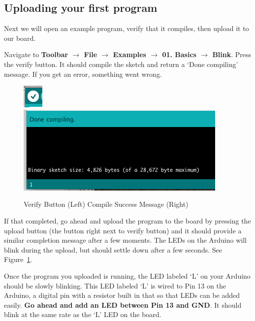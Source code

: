 \documentclass[11pt,a4paper]{article}
\begin{document}


\subsection{Uploading your first program} %
\label{sub:uploading_your_first_program}
Next we will open an example program, verify that it compiles, then upload it to our board.


Navigate to \textbf{Toolbar $\rightarrow$ File $\rightarrow$ Examples $\rightarrow$ 01. Basics $\rightarrow$ Blink}.  Press the verify button.  It should compile the sketch and return a `Done compiling' message.  If you get an error, something went wrong.

    \begin{figure}[htbp]
        \centering
            \includegraphics{figures/verify.png}\includegraphics{figures/compile.png}
        \caption{Verify Button (Left) Compile Success Message (Right)}
        \label{fig:figures_verify}
    \end{figure}

If that completed, go ahead and upload the program to the board by pressing the upload button (the button right next to verify button) and it should provide a similar completion message after a few moments.  The LEDs on the Arduino will blink during the upload, but should settle down after a few seconds.  See Figure~\ref{fig:figures_verify}.  
    
Once the program you uploaded is running, the LED labeled `L' on your Arduino should be slowly blinking.  This LED labeled `L' is wired to Pin 13 on the Arduino, a digital pin with a resistor built in that so that LEDs can be added easily.  \textbf{Go ahead and add an LED between Pin 13 and GND}.  It should blink at the same rate as the `L' LED on the board.
\end{document}

